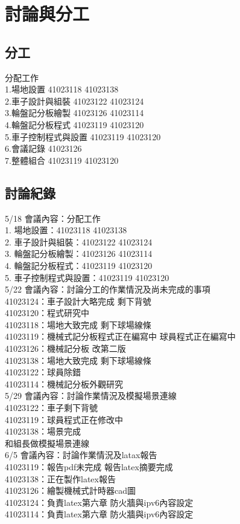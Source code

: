 \chapter{討論與分工}
\renewcommand{\baselinestretch}{10.0} %
\setcounter{page}{1}  %
\fontsize{14pt}{2.5pt}\sectionef
\section{分工}

分配工作\\
1.場地設置 41023118 41023138\\
2.車子設計與組裝 41023122 41023124\\
3.輪盤記分板繪製 41023126 41023114\\
4.輪盤記分板程式 41023119 41023120\\
5.車子控制程式與設置 41023119 41023120\\
6.會議記錄 41023126\\
7.整體組合 41023119 41023120\\

\section{討論紀錄}

5/18 會議內容：分配工作\\
1. 場地設置：41023118 41023138\\
2. 車子設計與組裝：41023122 41023124\\
3. 輪盤記分板繪製：41023126 41023114\\
4. 輪盤記分板程式：41023119 41023120\\
5. 車子控制程式與設置：41023119 41023120\\

5/22 會議內容：討論分工的作業情況及尚未完成的事項\\
41023124：車子設計大略完成 剩下背號\\
41023120：程式研究中\\
41023118：場地大致完成 剩下球場線條\\
41023119：機械式記分板程式正在編寫中 球員程式正在編寫中\\
41023126：機械記分板 改第二版\\
41023138：場地大致完成 剩下球場線條\\
41023122：球員除錯\\
41023114：機械記分板外觀研究\\

5/29 會議內容：討論作業情況及模擬場景連線\\
41023122：車子剩下背號\\
41023119：球員程式正在修改中\\
41023138：場景完成\\
和組長做模擬場景連線\\

6/5 會議內容：討論作業情況及latax報告\\
41023119：報告pdf未完成 報告latex摘要完成\\
41023138：正在製作latex報告\\
41023126：繪製機械式計時器cad圖\\
41023124：負責latex第六章 防火牆與ipv6內容設定\\
41023114：負責latex第六章 防火牆與ipv6內容設定\\
\newpage
